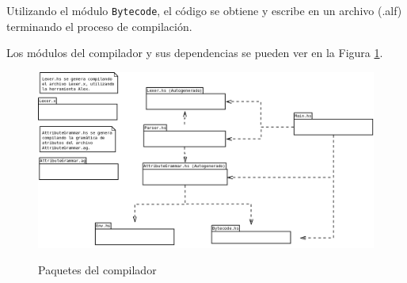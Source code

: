   Utilizando el módulo \texttt{Bytecode}, el código se obtiene y 
escribe en un archivo (.alf) terminando el proceso de compilación.

  Los módulos del compilador y sus dependencias se pueden ver en
la Figura \ref{fig:williecmodules}.

\begin{figure}[h!]
  \begin{center}
    \caption{Paquetes del compilador \compilador{}}
    {\includegraphics[width=160mm]{graphs/williecpackages.png}}
   \label{fig:williecmodules}
  \end{center}
\end{figure}
